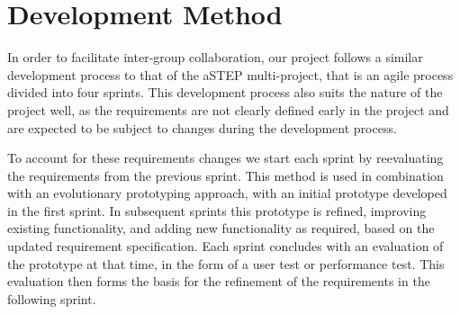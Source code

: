 \section{Development Method} \label{sec:dev_method}
In order to facilitate inter-group collaboration, our project follows a similar development process to that of the aSTEP multi-project, that is an agile process divided into four sprints. This development process also suits the nature of the project well, as the requirements are not clearly defined early in the project and are expected to be subject to changes during the development process. 

To account for these requirements changes we start each sprint by reevaluating the requirements from the previous sprint. This method is used in combination with an evolutionary prototyping approach, with an initial prototype developed in the first sprint. In subsequent sprints this prototype is refined, improving existing functionality, and adding new functionality as required, based on the updated requirement specification. Each sprint concludes with an evaluation of the prototype at that time, in the form of a user test or performance test. This evaluation then forms the basis for the refinement of the requirements in the following sprint. 

